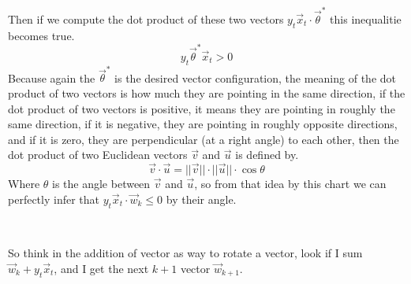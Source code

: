 \documentclass[12pt]{article}
\begin{document}
Then if we compute
the dot product of these two vectors $y_t\vec{x}_t \cdot \vec{\theta}^*$ this inequalitie
becomes true.
\[
  y_t\vec{\theta}^*\vec{x}_t > 0
\]
Because again the $\vec{\theta}^*$ is the desired vector configuration, the meaning of the dot product
of two vectors is how much they are pointing in the same direction,
if the dot product of two vectors is positive, it means they are pointing in
roughly the same direction, if it is negative, they are pointing in roughly opposite
directions, and if it is zero, they are perpendicular (at a right angle) to each other,
then the dot product of two Euclidean vectors $\vec{v}$ and $\vec{u}$ is defined by.
\[
  \vec{v} \cdot \vec{u} = ||\vec{v}|| \cdot ||\vec{u}|| \cdot \cos{\theta}
\]
Where $\theta$ is the angle between $\vec{v}$ and $\vec{u}$, so
from that idea
by this chart  we can perfectly infer that $y_t\vec{x}_t \cdot \vec{w}_k \le 0$ by their angle.\\
\begin{center}
 \\
\end{center}
So think in the addition of vector as way to rotate a vector, look if I sum $\vec{w}_k + y_t\vec{x}_t$,
and I get the next $k + 1$ vector $\vec{w}_{k + 1}$.
\begin{center}
 \\
\end{center}
\end{document}
